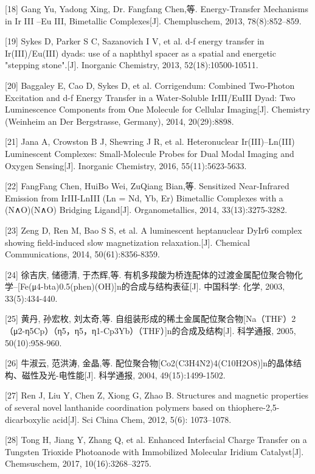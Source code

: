 \documentclass[UTF8,a4paper,10pt,twocolumn]{ctexart}
\begin{document}
\noindent{}[18] Gang Yu, Yadong Xing, Dr. Fangfang Chen,等. Energy-Transfer Mechanisms in Ir III –Eu III, Bimetallic Complexes[J]. Chempluschem, 2013, 78(8):852–859.

\noindent{}[19] Sykes D, Parker S C, Sazanovich I V, et al. d-f energy transfer in Ir(III)/Eu(III) dyads: use of a naphthyl spacer as a spatial and energetic "stepping stone".[J]. Inorganic Chemistry, 2013, 52(18):10500-10511.

\noindent{}[20] Baggaley E, Cao D, Sykes D, et al. Corrigendum: Combined Two‐Photon Excitation and d-f Energy Transfer in a Water‐Soluble IrIII/EuIII Dyad: Two Luminescence Components from One Molecule for Cellular Imaging[J]. Chemistry (Weinheim an Der Bergstrasse, Germany), 2014, 20(29):8898.

\noindent{}[21] Jana A, Crowston B J, Shewring J R, et al. Heteronuclear Ir(III)–Ln(III) Luminescent Complexes: Small-Molecule Probes for Dual Modal Imaging and Oxygen Sensing[J]. Inorganic Chemistry, 2016, 55(11):5623-5633.

\noindent{}[22] FangFang Chen, HuiBo Wei, ZuQiang Bian,等. Sensitized Near-Infrared Emission from IrIII-LnIII (Ln = Nd, Yb, Er) Bimetallic Complexes with a (N∧O)(N∧O) Bridging Ligand[J]. Organometallics, 2014, 33(13):3275-3282.

\noindent{}[23] Zeng D, Ren M, Bao S S, et al. A luminescent heptanuclear DyIr6 complex showing field-induced slow magnetization relaxation.[J]. Chemical Communications, 2014, 50(61):8356-8359.

\noindent{}[24] 徐吉庆, 储德清, 于杰辉,等. 有机多羧酸为桥连配体的过渡金属配位聚合物化学--[Fe(μ4-bta)0.5(phen)(OH)]n的合成与结构表征[J]. 中国科学: 化学, 2003, 33(5):434-440.

\noindent{}[25] 黄丹, 孙宏枚, 刘太奇,等. 自组装形成的稀土金属配位聚合物[Na（THF）2（μ2-η5Cp）（η5，η5，η1-Cp3Yb）（THF）]n的合成及结构[J]. 科学通报, 2005, 50(10):958-960.

\noindent{}[26] 牛淑云, 范洪涛, 金晶,等. 配位聚合物[Co2(C3H4N2)4(C10H2O8)]n的晶体结构、磁性及光-电性能[J]. 科学通报, 2004, 49(15):1499-1502.

\noindent{}[27] Ren J, Liu Y, Chen Z, Xiong G, Zhao B. Structures and magnetic properties of several novel lanthanide coordination polymers based on thiophere-2,5-dicarboxylic acid[J]. Sci China Chem, 2012, 5(6): 1073–1078.

\noindent{}[28] Tong H, Jiang Y, Zhang Q, et al. Enhanced Interfacial Charge Transfer on a Tungsten Trioxide Photoanode with Immobilized Molecular Iridium Catalyst[J]. Chemsuschem, 2017, 10(16):3268–3275.
\end{document}
